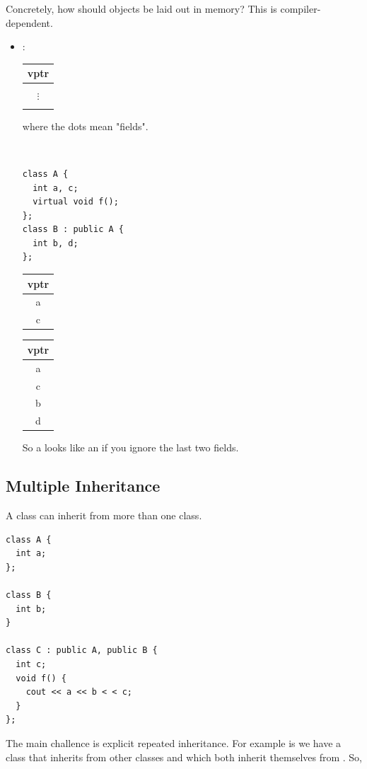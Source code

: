 \documentclass[english, 11pt]{article}
\begin{document}
Concretely, how should objects be laid out in memory? This is compiler-dependent.
\begin{itemize}
  \item {}: \begin{tabular}{|c|}
    \hline
    vptr \\
    \hline \\
    $\vdots$ \\ \\
    \hline
  \end{tabular}
  where the dots mean "fields".
  \begin{exmp} \
\begin{lstlisting}
class A {
  int a, c;
  virtual void f();
};
class B : public A {
  int b, d;
};
\end{lstlisting}
\begin{tabular}{|c|}
    \hline
    vptr \\
    \hline
    a \\
    \hline
    c \\
    \hline
  \end{tabular}
  \begin{tabular}{|c|}
    \hline
    vptr \\
    \hline
    a \\
    \hline
    c \\
    \hline
    b \\
    \hline
    d \\
    \hline
  \end{tabular}
  \end{exmp}
  So a  looks like an  if you ignore the last two fields.
\end{itemize}

\subsection{Multiple Inheritance}

A class can inherit from more than one class.
\begin{lstlisting}
class A {
  int a;
};

class B {
  int b;
}

class C : public A, public B {
  int c;
  void f() {
    cout << a << b < < c;
  }
};
\end{lstlisting}

The main challence is explicit repeated inheritance. For example is we have a class  that inherits from other classes  and  which both inherit themselves from . So,
\end{document}
